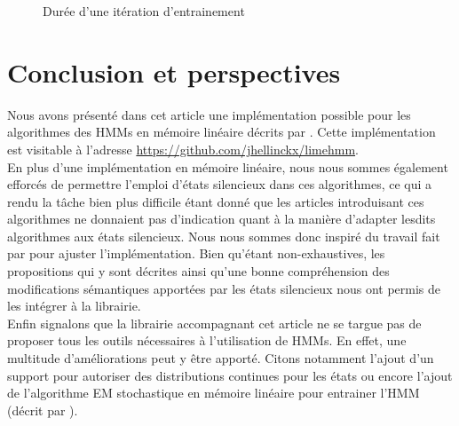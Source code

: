 \documentclass[letterpaper]{article}
\begin{document}
\begin{figure}[H]
  \centering
  \caption{Durée d'une itération d'entrainement}
\end{figure}


\section{Conclusion et perspectives}
Nous avons présenté dans cet article une implémentation possible pour les algorithmes des HMMs en mémoire linéaire décrits par \cite{MM, Ch, LM}. Cette implémentation est visitable à l'adresse \url{https://github.com/jhellinckx/limehmm}. \\

En plus d'une implémentation en mémoire linéaire, nous nous sommes également efforcés de permettre l'emploi d'états silencieux dans ces algorithmes, ce qui a rendu la tâche bien plus difficile étant donné que les articles introduisant ces algorithmes ne donnaient pas d'indication quant à la manière d'adapter lesdits algorithmes aux états silencieux. Nous nous sommes donc inspiré du travail fait par \cite{Durbin} pour ajuster l'implémentation. Bien qu'étant non-exhaustives, les propositions qui y sont décrites ainsi qu'une bonne compréhension des modifications sémantiques apportées par les états silencieux nous ont permis de les intégrer à la librairie. \\

Enfin signalons que la librairie accompagnant cet article ne se targue pas de proposer tous les outils nécessaires à l'utilisation de HMMs. En effet, une multitude d'améliorations peut y être apporté. Citons notamment l'ajout d'un support pour autoriser des distributions continues pour les états ou encore l'ajout de l'algorithme EM stochastique en mémoire linéaire pour entrainer l'HMM (décrit par \cite{LM}). 

\footnotesize


\end{document}
